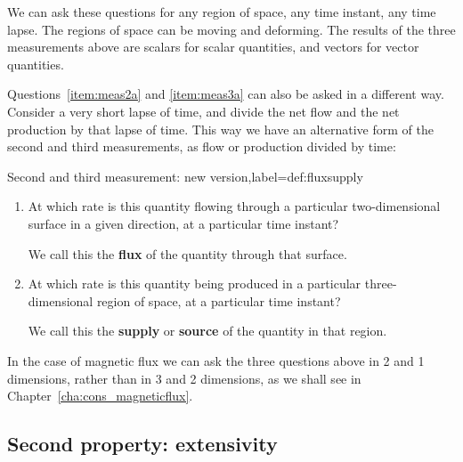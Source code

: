 \documentclass[a4paper,12pt,%
onecolumn,oneside,%
british%
]{memoir}
\renewcommand*{\|}[1][]{\nonscript\:#1\vert\nonscript\:\mathopen{}}
\newcommand*{\chap}{Chapter}%
\begin{document}
We can ask these questions for any region of space, any time instant, any time lapse. The regions of space can be moving and deforming. The results of the three measurements above are scalars for scalar quantities, and vectors for vector quantities.

Questions~\ref{item:meas2a} and \ref{item:meas3a} can also be asked in a different way. Consider a very short lapse of time, and divide the net flow and the net production by that lapse of time. This way we have an alternative form of the second and third measurements, as flow or production divided by time:
\begin{definition}{Second and third measurement: new version,label={def:fluxsupply}}
  \begin{enumerate}[label={M\arabic*b}.,start=2,leftmargin=3em]

  \item At which rate is this quantity flowing through a particular two-dimensional surface in a given direction, at a particular time instant?

    We call this the \textbf{flux} of the quantity through that surface.

  \item At which rate is this quantity being produced in a particular three-dimensional region of space, at a particular time instant?

    We call this the \textbf{supply} or \textbf{source} of the quantity in that region.
  \end{enumerate}
\end{definition}

In the case of magnetic flux we can ask the three questions above in 2 and 1 dimensions, rather than in 3 and 2 dimensions, as we shall see in \chap~\ref{cha:cons_magneticflux}.

\subsection{Second property: extensivity}
\label{sec:sevenquantities_property2}
\end{document}
